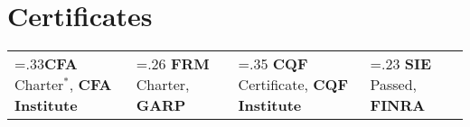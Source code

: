 \documentclass[letterpaper,hidelinks]{article}
\newcommand{\resumeSubHeadingListStart}{\begin{itemize}[leftmargin=0.1in, label={}]}
\newcommand{\resumeSubHeadingListEnd}{\end{itemize}}
\begin{document}
\vspace{-4pt}
\section{Certificates}
\resumeSubHeadingListStart
\small{\item{
  \begin{tabularx}{0.96\textwidth} { 
     >{\centering\arraybackslash\hsize=.33\hsize}X 
    || >{\centering\arraybackslash\hsize=.26\hsize}X 
    || >{\centering\arraybackslash\hsize=.35\hsize}X  
    || >{\centering\arraybackslash\hsize=.23\hsize}X } 
    \textbf{CFA} Charter$\mathbb{}^\ast$, \textbf{CFA Institute} & 
    \textbf{FRM} Charter, \textbf{GARP} & 
    \textbf{CQF} Certificate, \textbf{CQF Institute} & 
    \textbf{SIE} Passed, \textbf{FINRA}
  \end{tabularx}
}}
\resumeSubHeadingListEnd

\vspace{-11pt}
\end{document}
